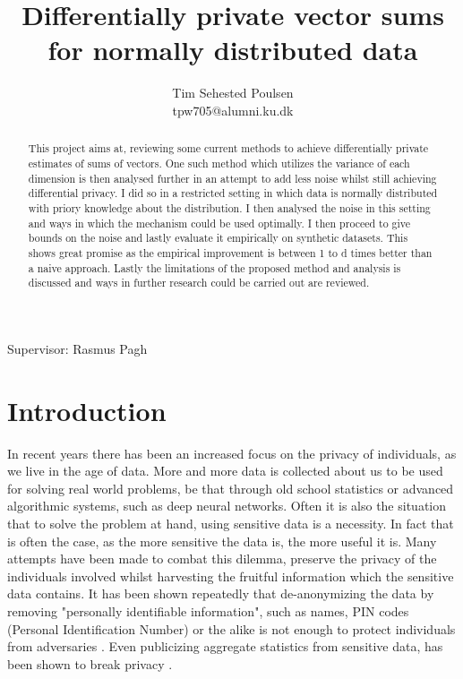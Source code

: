 \documentclass[a4paper,12pt]{article}
\title{\textbf{Differentially private vector sums for normally distributed data}}
\author{Tim Sehested Poulsen \\ tpw705@alumni.ku.dk}
\begin{document}
\maketitle
\begin{center}
Supervisor: Rasmus Pagh
\end{center}
\begin{figure}[b]
\end{figure}
\newpage
\begin{abstract}
This project aims at, reviewing some current methods to achieve differentially private estimates
of sums of vectors. One such method which utilizes the variance of each dimension
is then analysed further in an attempt to add less noise whilst still achieving differential privacy.
I did so in a restricted setting in which data is normally distributed with 
priory knowledge about the distribution. I then analysed the 
noise in this setting and ways in which the mechanism could be used optimally.
I then proceed to give bounds on the noise and lastly evaluate it empirically on
synthetic datasets. This shows great promise as the empirical improvement is between 1 to d times better than a naive approach.
Lastly the limitations of the proposed method and analysis is discussed and ways in
further research could be carried out are reviewed. 
\end{abstract}
\newpage

\tableofcontents

\newpage
\section{Introduction}
In recent years there has been an increased focus on the privacy of individuals, as we live in the age of data.
More and more data is collected about us to be used for solving real world problems, be that through old school statistics or
advanced algorithmic systems, such as deep neural networks.
Often it is also the situation that to solve the problem at hand, using sensitive data is a necessity.
In fact that is often the case, as the more sensitive the data is, the more useful it is.
Many attempts have been made to combat this dilemma, preserve the privacy of the individuals involved whilst harvesting the
fruitful information which the sensitive data contains.
It has been shown repeatedly that de-anonymizing the data by removing "personally identifiable information", such as names, PIN codes (Personal Identification Number) or the alike is not enough
to protect individuals from adversaries \cite{medical,netflix}.
Even publicizing aggregate statistics from sensitive data, has been shown to break privacy \cite{exposed}.
\end{document}
